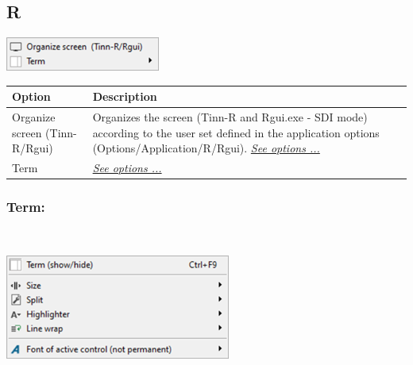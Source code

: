 \hypertarget{menu_view_r}{}
\subsection{R}

\includegraphics[scale=0.8]{./res/menu_view_r.png}\\

\begin{scriptsize}
  \begin{tabularx}{\textwidth}{>{\hsize=0.5\hsize}X>{\hsize=0.7\hsize}X}\\
    \hline
    \textbf{Option} & \textbf{Description} \\
    \hline
    Organize screen (Tinn-R/Rgui) & Organizes the screen (Tinn-R and Rgui.exe - SDI mode) according to the user set defined
     in the application options (Options/Application/R/Rgui). \textit{\href{\#working\_app\_r}{See options ...}} \\
    Term & \textit{\href{\#menu\_view\_r\_term}{See options ...}} \\
    \hline
  \end{tabularx}
\end{scriptsize}

\newpage
\hypertarget{menu_view_r_term}{}
\subsubsection{Term:}\\

\includegraphics[scale=0.8]{./res/menu_view_r_term.png}\\

